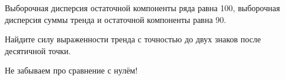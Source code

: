 
\begin{question}
Выборочная дисперсия остаточной компоненты ряда равна 100,
выборочная дисперсия суммы тренда и остаточной компоненты равна 90.

Найдите силу выраженности тренда с точностью до двух знаков после десятичной точки.
\end{question}

\begin{solution}
Не забываем про сравнение с нулём!
\end{solution}

